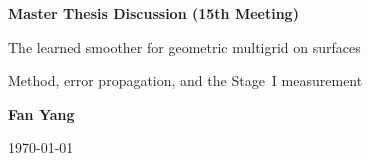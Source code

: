 \vspace{0.5cm} %



\vspace{4.2cm}

\centering

{\Large \textbf{Master Thesis Discussion (15th Meeting)}}

\vspace{0.4cm}

{\large The learned smoother for geometric multigrid on surfaces}

\vspace{0.25cm}

{\normalsize Method, error propagation, and the Stage~I measurement}

\vspace{0.5cm}

{\textcolor{\alertcolor}{\textbf{Fan Yang}}}

\vspace{0.2cm}

{\small \today}


\vspace{-0.4cm}
